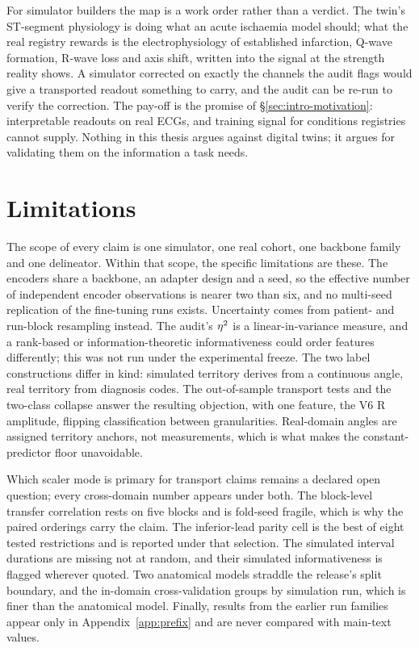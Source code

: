 For simulator builders the map is a work order rather than a verdict. The twin's ST-segment physiology is doing what an acute ischaemia model should; what the real registry rewards is the electrophysiology of established infarction, Q-wave formation, R-wave loss and axis shift, written into the signal at the strength reality shows. A simulator corrected on exactly the channels the audit flags would give a transported readout something to carry, and the audit can be re-run to verify the correction. The pay-off is the promise of \S\ref{sec:intro-motivation}: interpretable readouts on real ECGs, and training signal for conditions registries cannot supply. Nothing in this thesis argues against digital twins; it argues for validating them on the information a task needs.

\section{Limitations}
\label{sec:conc-limits}

The scope of every claim is one simulator, one real cohort, one backbone family and one delineator. Within that scope, the specific limitations are these. The encoders share a backbone, an adapter design and a seed, so the effective number of independent encoder observations is nearer two than six, and no multi-seed replication of the fine-tuning runs exists. Uncertainty comes from patient- and run-block resampling instead. The audit's $\eta^{2}$ is a linear-in-variance measure, and a rank-based or information-theoretic informativeness could order features differently; this was not run under the experimental freeze. The two label constructions differ in kind: simulated territory derives from a continuous angle, real territory from diagnosis codes. The out-of-sample transport tests and the two-class collapse answer the resulting objection, with one feature, the V6 R amplitude, flipping classification between granularities. Real-domain angles are assigned territory anchors, not measurements, which is what makes the constant-predictor floor unavoidable.

Which scaler mode is primary for transport claims remains a declared open question; every cross-domain number appears under both. The block-level transfer correlation rests on five blocks and is fold-seed fragile, which is why the paired orderings carry the claim. The inferior-lead parity cell is the best of eight tested restrictions and is reported under that selection. The simulated interval durations are missing not at random, and their simulated informativeness is flagged wherever quoted. Two anatomical models straddle the release's split boundary, and the in-domain cross-validation groups by simulation run, which is finer than the anatomical model. Finally, results from the earlier run families appear only in Appendix~\ref{app:prefix} and are never compared with main-text values. 

